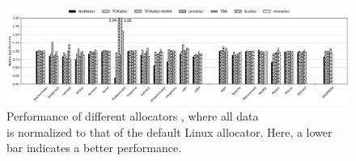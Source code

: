 \begin{figure}[!ht]
    \centering
    \includegraphics[width=7in]{SC2022/figure/8-node-parsec-perf.jpg}
    \caption{Performance of different allocators , where all data\\ is normalized to that of the default Linux allocator. Here, a lower bar indicates a better performance.
    \label{fig:perf1}}
 \end{figure}


